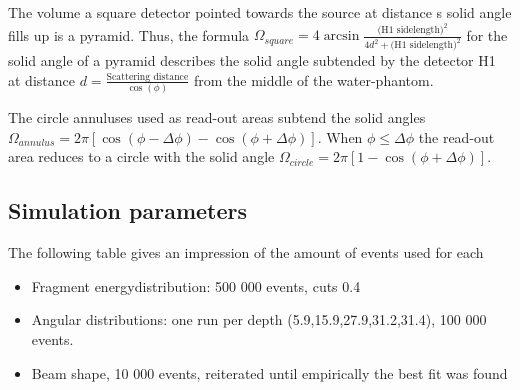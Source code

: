 The volume a square detector pointed towards the source at distance s solid angle fills up is a pyramid. Thus, the formula $\Omega_{square} = 4 \arcsin{\frac{\text{(H1 sidelength)}^2}{4d^2+\text{(H1 sidelength)}^2}}$ for the solid angle of a pyramid describes the solid angle subtended by the detector H1 at distance $d = \frac{\text{Scattering distance}}{\cos(\phi)}$ from the middle of the water-phantom.

The circle annuluses used as read-out areas subtend the solid angles $\Omega_{annulus} = 2 \pi [\cos(\phi - \Delta\phi) - \cos(\phi + \Delta\phi)]$. When $\phi \le \Delta\phi$ the read-out area reduces to a circle with the solid angle $\Omega_{circle} = 2 \pi [1 - \cos(\phi + \Delta\phi)]$.




\subsection{Simulation parameters}
The following table gives an impression of the amount of events used for each
\begin{itemize}
 \item Fragment energydistribution: 500 000 events, cuts 0.4
 \item Angular distributions: one run per depth (5.9,15.9,27.9,31.2,31.4), 100 000 events.
 \item Beam shape, 10 000 events, reiterated until empirically the best fit was found
\end{itemize}


